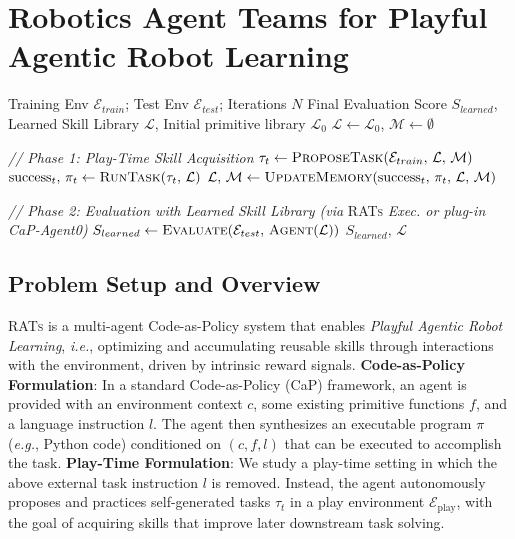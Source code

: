 \section{Robotics Agent Teams for Playful Agentic Robot Learning}
\label{sec:method}

\begin{algorithm}[t]
\caption{\textsc{RATs} at Play}
\label{alg:rats}
\begin{algorithmic}[1]
\Require Training Env $\mathcal{E}_{train}$; Test Env $\mathcal{E}_{test}$; Iterations $N$
\Ensure Final Evaluation Score $S_{learned}$, Learned Skill Library $\mathcal{L}$, Initial primitive library $\mathcal{L}_0$
\State $\mathcal{L} \gets \mathcal{L}_0$, $\mathcal{M} \gets \emptyset$

\Statex \hspace{1.2em}\textit{// Phase 1: Play-Time Skill Acquisition}
    \State $\tau_t \gets \textsc{ProposeTask}(\mathcal{E}_{train},\, \mathcal{L},\, \mathcal{M})$ 
    \State $\text{success}_t,\, \pi_t \gets \textsc{RunTask}(\tau_t,\, \mathcal{L})$ 
    \State $\mathcal{L},\, \mathcal{M} \gets \textsc{UpdateMemory}(\text{success}_t,\, \pi_t,\, \mathcal{L},\, \mathcal{M})$ 
\EndFor

\Statex \hspace{1.2em}\textit{// Phase 2: Evaluation with Learned Skill Library (via} \textsc{RATs} \textit{Exec. or plug-in CaP-Agent0)}
\State $S_{learned} \gets \textsc{Evaluate}(\mathcal{E}_{test},\, \textsc{Agent}(\mathcal{L}))$ 
\State \Return $S_{learned},\, \mathcal{L}$
\end{algorithmic}
\end{algorithm}

\subsection{Problem Setup and Overview}
\label{sec:setup}

\textsc{RATs} is a multi-agent Code-as-Policy system that enables \textit{Playful Agentic Robot Learning}, \textit{i.e.}, optimizing and accumulating reusable skills through interactions with the environment, driven by intrinsic reward signals.
\textbf{Code-as-Policy Formulation}: In a standard Code-as-Policy (CaP) framework, an agent is provided with an environment context $c$, some existing primitive functions $f$, and a language instruction $l$. The agent then synthesizes an executable program $\pi$ (\textit{e.g.}, Python code) conditioned on $(c, f, l)$ that can be executed to accomplish the task. 
\textbf{Play-Time Formulation}:
We study a play-time setting in which the above external task instruction $l$ is removed. Instead, the agent autonomously proposes and practices self-generated tasks $\tau_t$ in a play environment $\mathcal{E}_{\text{play}}$, with the goal of acquiring skills that improve later downstream task solving.

